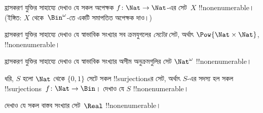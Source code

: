 \documentclass[../../../include/open-logic-section]{subfiles}
\begin{document}
\begin{prob}\label{sfr:siz:red:prob:nat-nat}
  হ্রাসকরণ যুক্তির সাহায্যে দেখাও যে সকল অপেক্ষক $f\colon \Nat \to \Nat$-এর সেট~$X$
  !!{nonenumerable}। (ইঙ্গিত: $X$ থেকে~$\Bin^\omega$-তে একটি সমাপতিত অপেক্ষক দাও।)
\end{prob}

\begin{prob}
হ্রাসকরণ যুক্তির সাহায্যে দেখাও যে স্বাভাবিক সংখ্যার সব ক্রমযুগলের \emph{সেটের} সেট,
অর্থাৎ $\Pow{\Nat \times \Nat}$, !!{nonenumerable}।
\end{prob}

\begin{prob}
হ্রাসকরণ যুক্তির সাহায্যে দেখাও যে স্বাভাবিক সংখ্যার অসীম অনুক্রমগুলির সেট $\Nat^\omega$ !!{nonenumerable}।
\end{prob}


\begin{prob}
ধরি, $S$ হলো $\Nat$ থেকে $\{0,1\}$ সেটে সকল !!{surjection}sর সেট, অর্থাৎ $S$-এর সদস্য হল সকল !!{surjection}s~$f \colon \Nat
\to \Bin$। দেখাও যে $S$ !!{nonenumerable}।
\end{prob}

\begin{prob}
দেখাও যে সকল বাস্তব সংখ্যার সেট~$\Real$ !!{nonenumerable}।
\end{prob}
\end{document}
